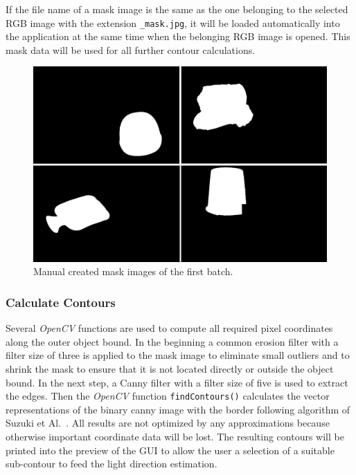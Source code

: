 If the file name of a mask image is the same as the one belonging to the selected RGB image with the extension \texttt{\_mask.jpg}, it will be loaded automatically into the application at the same time when the belonging RGB image is opened. This mask data will be used for all further contour calculations.

\begin{figure} [H]
	\center 
	\includegraphics[width=12cm]{Images/batch1_mask.jpg}			
	\caption[Bildunterschrift]{Manual created mask images of the first batch.}
	\label{fig:batch1mask}
\end{figure}

\subsubsection{Calculate Contours}\label{sec:findContours}

Several \textit{OpenCV} functions are used to compute all required pixel coordinates along the outer object bound. In the beginning a common erosion filter with a filter size of three is applied to the mask image to eliminate small outliers and to shrink the mask to ensure that it is not located directly or outside the object bound. In the next step, a Canny filter with a filter size of five is used to extract the edges. Then the \textit{OpenCV} function \texttt{findContours()} calculates the vector representations of the binary canny image with the border following algorithm of Suzuki et Al.~\cite{SUZUKI198532}. All results are not optimized by any approximations because otherwise important coordinate data will be lost. The resulting contours will be printed into the preview of the GUI to allow the user a selection of a suitable sub-contour to feed the light direction estimation.

